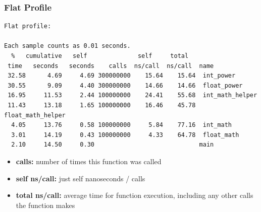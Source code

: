 \begin{frame}[fragile]
  \frametitle{Flat Profile}



\begin{changemargin}{1.5cm}
  \begin{lstlisting}[basicstyle=\tiny]
Flat profile:

Each sample counts as 0.01 seconds.
  %   cumulative   self              self     total           
 time   seconds   seconds    calls  ns/call  ns/call  name    
 32.58      4.69     4.69 300000000    15.64    15.64  int_power
 30.55      9.09     4.40 300000000    14.66    14.66  float_power
 16.95     11.53     2.44 100000000    24.41    55.68  int_math_helper
 11.43     13.18     1.65 100000000    16.46    45.78  float_math_helper
  4.05     13.76     0.58 100000000     5.84    77.16  int_math
  3.01     14.19     0.43 100000000     4.33    64.78  float_math
  2.10     14.50     0.30                             main
  \end{lstlisting}


  \begin{itemize}
    \item {\bf calls:} number of times this function was called
    \item {\bf self ns/call:} just self nanoseconds / calls
    \item {\bf total ns/call:} average time for function execution, including
      any other calls the function makes
  \end{itemize}
  \end{changemargin}
\end{frame}

